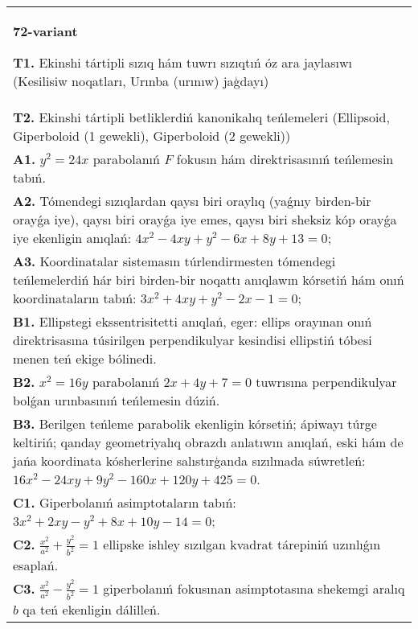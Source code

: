 \documentclass{article}
\begin{document}
\begin{tabular}{m{17cm}}
\textbf{72-variant}
\newline

\textbf{T1.} Ekinshi tártipli sızıq hám tuwrı sızıqtıń óz ara jaylasıwı (Kesilisiw noqatları, Urınba (urınıw) jaģdayı) \\
\textbf{T2.} Ekinshi tártipli betliklerdiń kanonikalıq teńlemeleri (Ellipsoid, Giperboloid (1 gewekli), Giperboloid (2 gewekli)) \\
\textbf{A1.} $y^2=24 x$ parabolanıń $F$ fokusın hám direktrisasınıń teńlemesin tabıń. \\
\textbf{A2.} Tómendegi sızıqlardan qaysı biri oraylıq (yaǵnıy birden-bir orayǵa iye), qaysı biri orayǵa iye emes, qaysı biri sheksiz kóp orayǵa iye ekenligin anıqlań: $4 x^2-4 x y+y^2-6 x+8 y+13=0$; \\
\textbf{A3.} Koordinatalar sistemasın túrlendirmesten tómendegi teńlemelerdiń hár biri birden-bir noqattı anıqlawın kórsetiń hám onıń koordinataların tabıń: $3 x^2+4 x y+y^2-2 x-1=0$; \\
\textbf{B1.} Ellipstegi ekssentrisitetti anıqlań, eger: ellips orayınan onıń direktrisasına túsirilgen perpendikulyar kesindisi ellipstiń tóbesi menen teń ekige bólinedi. \\
\textbf{B2.} $x^2=16y$ parabolanıń $2x+4y+7=0$ tuwrısına perpendikulyar bolǵan urınbasınıń teńlemesin dúziń. \\
\textbf{B3.} Berilgen teńleme parabolik ekenligin kórsetiń; ápiwayı túrge keltiriń; qanday geometriyalıq obrazdı anlatıwın anıqlań, eski hám de jańa koordinata kósherlerine salıstırģanda sızılmada súwretleń:$16 x^2-24 x y+9 y^2-160 x+120 y+425=0$. \\
\textbf{C1.} Giperbolanıń asimptotaların tabıń: $3 x^2+2 x y-y^2+8 x+10 y-14=0$; \\
\textbf{C2.} $\frac{x^2}{a^2}+\frac{y^2}{b^2}=1$ ellipske ishley sızılgan kvadrat tárepiniń uzınlıǵın esaplań. \\
\textbf{C3.} $\frac{x^2}{a^2}-\frac{y^2}{b^2}=1$ giperbolanıń fokusınan asimptotasına shekemgi aralıq $b$ qa teń ekenligin dálilleń. \\

\end{tabular}
\vspace{1cm}
\end{document}
